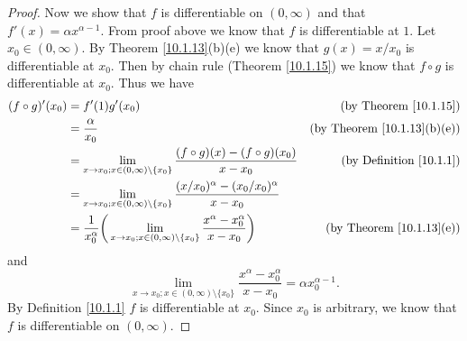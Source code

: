 \begin{proof}
    Now we show that \(f\) is differentiable on \((0, \infty)\) and that \(f'(x) = \alpha x^{\alpha - 1}\).
    From proof above we know that \(f\) is differentiable at \(1\).
    Let \(x_0 \in (0, \infty)\).
    By Theorem \ref{10.1.13}(b)(e) we know that \(g(x) = x / x_0\) is differentiable at \(x_0\).
    Then by chain rule (Theorem \ref{10.1.15}) we know that \(f \circ g\) is differentiable at \(x_0\).
    Thus we have
    \begin{align*}
        (f \circ g)'(x_0) & = f'(1) g'(x_0)                                                                                                                       & \text{(by Theorem \ref{10.1.15})}       \\
                          & = \frac{\alpha}{x_0}                                                                                                                  & \text{(by Theorem \ref{10.1.13}(b)(e))} \\
                          & = \lim_{x \to x_0 ; x \in (0, \infty) \setminus \{x_0\}} \frac{(f \circ g)(x) - (f \circ g)(x_0)}{x - x_0}                            & \text{(by Definition \ref{10.1.1})}     \\
                          & = \lim_{x \to x_0 ; x \in (0, \infty) \setminus \{x_0\}} \frac{(x / x_0)^{\alpha} - (x_0 / x_0)^{\alpha}}{x - x_0}                                                              \\
                          & = \frac{1}{x_0^{\alpha}} \bigg(\lim_{x \to x_0 ; x \in (0, \infty) \setminus \{x_0\}} \frac{x^{\alpha} - x_0^{\alpha}}{x - x_0}\bigg) & \text{(by Theorem \ref{10.1.13}(e))}
    \end{align*}
    and
    \[
        \lim_{x \to x_0 ; x \in (0, \infty) \setminus \{x_0\}} \frac{x^{\alpha} - x_0^{\alpha}}{x - x_0} = \alpha x_0^{\alpha - 1}.
    \]
    By Definition \ref{10.1.1} \(f\) is differentiable at \(x_0\).
    Since \(x_0\) is arbitrary, we know that \(f\) is differentiable on \((0, \infty)\).
\end{proof}